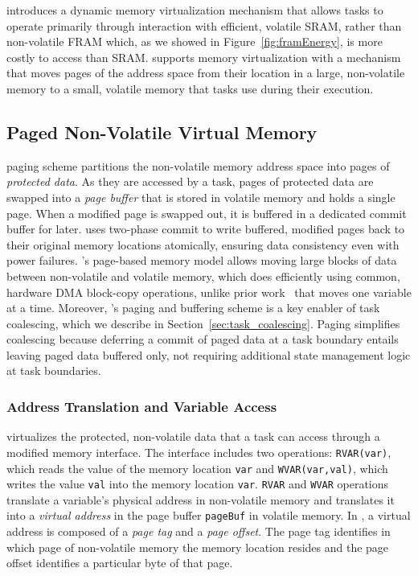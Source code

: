 \sys introduces a dynamic memory virtualization mechanism that allows tasks to operate primarily through interaction with efficient, volatile SRAM, rather than non-volatile FRAM which, as we showed in Figure~\ref{fig:framEnergy}, is more costly to access than SRAM. \sys supports memory virtualization with a mechanism that moves pages of the address space from their location in a large, non-volatile memory to a small, volatile memory that tasks use during their execution.

\subsection{Paged Non-Volatile Virtual Memory} 

\sys paging scheme partitions the non-volatile memory address space into pages of {\em protected data}. As they are accessed by a task, pages of protected data are swapped into a {\em page buffer} that is stored in volatile memory and holds a single page. When a modified page is swapped out, it is buffered in a dedicated commit buffer for later. \sys uses two-phase commit to write buffered, modified pages back to their original memory locations atomically, ensuring data consistency even with power failures. \sys's page-based memory model allows moving large blocks of data between non-volatile and volatile memory, which \sys does efficiently using common,
hardware DMA block-copy operations, unlike prior work~\cite{chain,alpaca} that moves one variable at a time. Moreover, \sys's paging and buffering scheme is a key enabler of task coalescing, which we describe in Section~\ref{sec:task_coalescing}. Paging simplifies coalescing because deferring a commit of paged data at a task boundary entails leaving paged data buffered only, not requiring additional state management logic at task boundaries.

\subsubsection{Address Translation and Variable Access}

\sys virtualizes the protected, non-volatile data that a task can access through a modified memory interface. The interface includes two operations: \texttt{RVAR(var)}, which reads the value of the memory location {\tt var} and \texttt{WVAR(var,val)}, which writes the value {\tt val} into the memory location {\tt var}. {\tt RVAR} and {\tt WVAR} operations translate a variable's physical address in non-volatile memory and translates it into a \emph{virtual address} in the page buffer \texttt{pageBuf} in volatile memory.  In \sys, a virtual address is composed of a \emph{page tag} and a \emph{page offset}. The page tag identifies in which page of non-volatile memory the memory location resides and the page offset identifies a particular byte of that page. 

